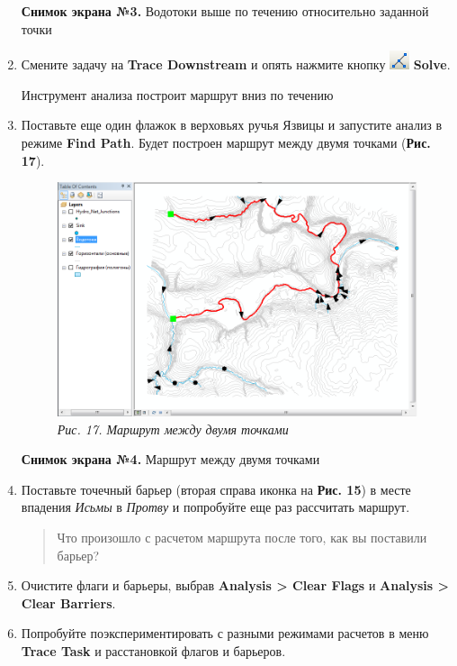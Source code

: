 \documentclass[12pt,]{book}
\begin{document}
\begin{enumerate}
  \textbf{Снимок экрана №3.} Водотоки выше по течению относительно заданной точки
\item
  Смените задачу на \textbf{Trace Downstream} и опять нажмите кнопку \includegraphics{images/Ex13/image29.png} \textbf{Solve}.

  Инструмент анализа построит маршрут вниз по течению
\item
  Поставьте еще один флажок в верховьях ручья Язвицы и запустите анализ в режиме \textbf{Find Path}. Будет построен маршрут между двумя точками (\textbf{Рис. 17}).

  \begin{figure}
  \centering
  \includegraphics{images/Ex13/image31.png}
  \caption{\emph{Рис. 17. Маршрут между двумя точками}}
  \end{figure}

  \textbf{Снимок экрана №4.} Маршрут между двумя точками
\item
  Поставьте точечный барьер (вторая справа иконка на \textbf{Рис. 15}) в месте впадения \emph{Исьмы} в \emph{Протву} и попробуйте еще раз рассчитать маршрут.

  \begin{quote}
  Что произошло с расчетом маршрута после того, как вы поставили барьер?
  \end{quote}
\item
  Очистите флаги и барьеры, выбрав \textbf{Analysis \textgreater{} Clear Flags} и \textbf{Analysis \textgreater{} Clear Barriers}.
\item
  Попробуйте поэкспериментировать с разными режимами расчетов в меню \textbf{Trace Task} и расстановкой флагов и барьеров.


\end{enumerate}
\end{document}
